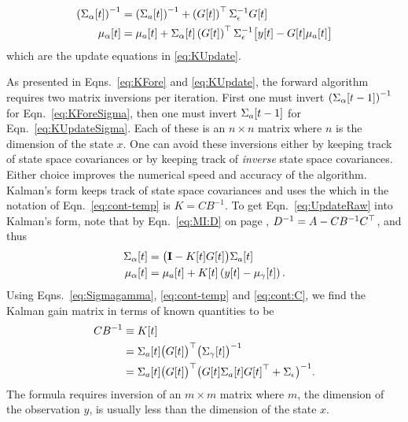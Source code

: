 \begin{enumerate}
  \begin{subequations}
    \label{eq:FUpdateAgain}
    \begin{align}
      \left( {\Sigma_\alpha}{[t]} \right)^{-1} &= \left(
        {\Sigma_a}{[t]} \right)^{-1} + \left( {G}{[t]}
        \right)^\top \Sigma_\epsilon^{-1} {G}{[t]} \\
      {\mu_\alpha}{[t]} &= {\mu_a}{[t]} +
      {\Sigma_{\alpha}}{[t]} \left( {G}{[t]} \right)^\top
      \Sigma_\epsilon^{-1} \big[{y}{[t]} - {G}{[t]}
      {\mu_a}{[t]}\big]
    \end{align}
  \end{subequations}
  which are the update equations in \eqref{eq:KUpdate}.
\end{enumerate}

As presented in Eqns.~\eqref{eq:KFore} and \eqref{eq:KUpdate}, the
forward algorithm requires two matrix inversions per iteration.  First
one must invert $\left( {\Sigma_\alpha}{[t-1]}\right)^{-1}$ for
Eqn.~\eqref{eq:KForeSigma}, then one must invert ${\Sigma_a}{[t-1]}$
for Eqn.~\eqref{eq:KUpdateSigma}.  Each of these is an $n\times n$
matrix where $n$ is the dimension of the state $x$.  One can avoid
these inversions either by keeping track of state space covariances or
by keeping track of \emph{inverse} state space covariances.  Either
choice improves the numerical speed and accuracy of the algorithm.
Kalman's form keeps track of state space covariances and uses the
\emph{} %
%
which in the notation of Eqn.~\eqref{eq:cont-temp} is $K=CB^{-1}$.  To
get Eqn.~\eqref{eq:UpdateRaw} into Kalman's form, note that by
Eqn.~\eqref{eq:MI:D} on page \pageref{eq:MI:D},
$D^{-1} = A -CB^{-1} C^\top$, and thus
\begin{subequations}
  \label{eq:KalmanFormAgain}
  \begin{align}
    {\Sigma_\alpha}{[t]} &= \big({\bf I} - {K}{[t]} {G}{[t]}
    \big) {\Sigma_a}{[t]} \\
    {\mu_\alpha}{[t]} &= {\mu_a}{[t]} + {K}{[t]} \left(
      {y}{[t]} - {\mu_\gamma}{[t]}\right).
  \end{align}
\end{subequations}
Using Eqns.~\eqref{eq:Sigmagamma}, \eqref{eq:cont-temp} and
\eqref{eq:cont:C}, we find the Kalman gain matrix in terms of known
quantities to be
\begin{align}
  \nonumber
  CB^{-1} &\equiv {K}{[t]}\\
  \nonumber
  &= {\Sigma_{a}}{[t]} \big({G}{[t]} \big)^\top \big(
    {\Sigma_\gamma}{[t]}\big)^{-1}\\
  \label{eq:KalmanGainDerived}
  &= {\Sigma_{a}}{[t]} \big({G}{[t]} \big)^\top \big({G}{[t]}{\Sigma_a}{[t]}{G}{[t]}^\top +
    \Sigma_\epsilon \big)^{-1}.
\end{align}
The formula requires inversion of an $m\times m$ matrix where $m$, the
dimension of the observation $y$, is usually less than the dimension of
the state $x$.


